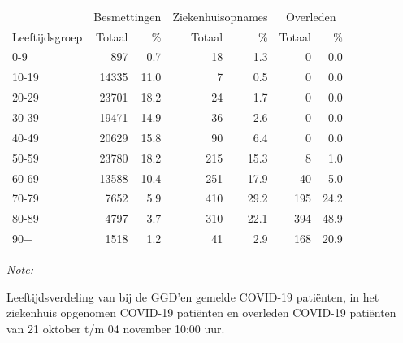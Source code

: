 \documentclass[
  english,
  man,floatsintext]{apa6}
\begin{document}
\begin{table}[H]
\centering\begingroup\fontsize{11}{13}\selectfont

\begin{threeparttable}
\begin{tabular}{lrrrrrr}
\toprule
\multicolumn{1}{c}{ } & \multicolumn{2}{c}{Besmettingen} & \multicolumn{2}{c}{Ziekenhuisopnames} & \multicolumn{2}{c}{Overleden} \\
\cmidrule(l{3pt}r{3pt}){2-3} \cmidrule(l{3pt}r{3pt}){4-5} \cmidrule(l{3pt}r{3pt}){6-7}
Leeftijdsgroep & Totaal & \% & Totaal & \% & Totaal & \%\\
\midrule
0-9 & 897 & 0.7 & 18 & 1.3 & 0 & 0.0\\
10-19 & 14335 & 11.0 & 7 & 0.5 & 0 & 0.0\\
20-29 & 23701 & 18.2 & 24 & 1.7 & 0 & 0.0\\
30-39 & 19471 & 14.9 & 36 & 2.6 & 0 & 0.0\\
40-49 & 20629 & 15.8 & 90 & 6.4 & 0 & 0.0\\
50-59 & 23780 & 18.2 & 215 & 15.3 & 8 & 1.0\\
60-69 & 13588 & 10.4 & 251 & 17.9 & 40 & 5.0\\
70-79 & 7652 & 5.9 & 410 & 29.2 & 195 & 24.2\\
80-89 & 4797 & 3.7 & 310 & 22.1 & 394 & 48.9\\
90+ & 1518 & 1.2 & 41 & 2.9 & 168 & 20.9\\
\bottomrule
\end{tabular}
\begin{tablenotes}
\item \textit{Note: } 
\item Leeftijdsverdeling van bij de GGD’en gemelde COVID-19 patiënten, in het ziekenhuis opgenomen COVID-19 patiënten en overleden COVID-19 patiënten van 21 oktober t/m 04 november 10:00 uur.
\end{tablenotes}
\end{threeparttable}
\endgroup{}
\end{table}
\end{document}
